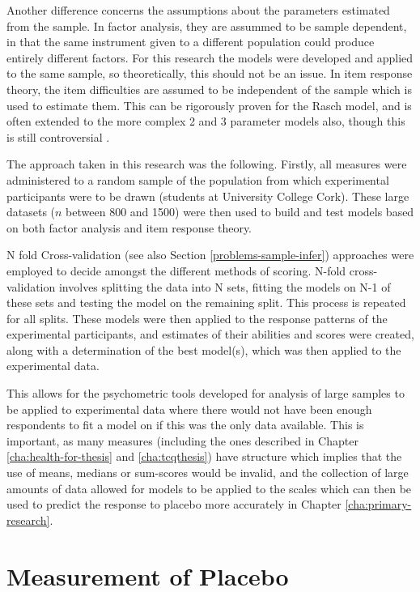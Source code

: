 Another difference concerns the assumptions about the parameters estimated from the sample. In factor analysis, they are assummed to be sample dependent, in that the same instrument given to a different population could produce entirely different factors.   For this research the models were developed and applied to the same sample, so theoretically, this should not be an issue.  In item response theory, the item difficulties are assumed to be independent of the sample which is used to estimate them. This can be rigorously proven for the Rasch model, and is often extended to the more complex 2 and 3 parameter models also, though this is still controversial \cite{van1997handbook}.

The approach taken in this research  was the following. Firstly, all measures were administered to a random sample of the population from which experimental participants were to be drawn (students at University College Cork). These large datasets ($n$ between 800 and 1500) were then used to build and test models based on both factor analysis and item response theory.

N fold Cross-validation \cite{friedman2009elements} (see also Section \ref{problems-sample-infer}) approaches were employed to decide amongst the different methods of scoring. N-fold cross-validation involves splitting the data into N sets, fitting the models on N-1 of these sets and testing the model on the remaining split. This process is repeated for all splits. These models were then  applied to the response patterns of the experimental participants, and estimates of their abilities and scores were created, along with a determination of the best model(s), which was then applied to the experimental data. 

 This allows for the psychometric tools developed for analysis of large samples to be applied to experimental data where there would not have been enough respondents to fit a model on if this was the only data available. This is important, as many measures (including the ones described in Chapter \ref{cha:health-for-thesis} and \ref{cha:tcqthesis}) have structure which implies that the use of means, medians or sum-scores would be invalid, and the collection of large amounts of data allowed for models to be applied to the scales which can then be used to predict the response to placebo more accurately in Chapter \ref{cha:primary-research}. 

\section{Measurement of Placebo}
\label{sec:measurement-placebo}

